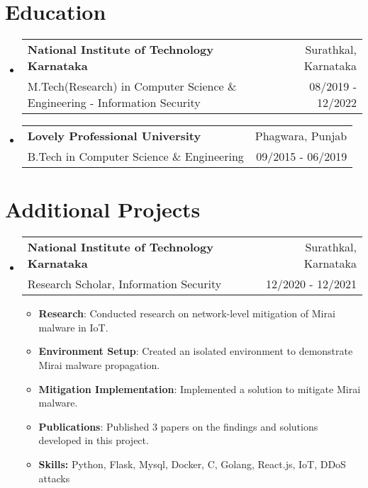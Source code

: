 \documentclass[letterpaper,11pt]{article}
\makeatletter
\newcommand{\cvitem}[1]{
  \item\small{
    {#1\vspace{-2pt}}
  }
}
\newcommand{\cvheading}[4]{
  \vspace{-2pt}\item
    \begin{tabular*}{\textwidth}[t]{l@{\extracolsep{\fill}}r}
      \textbf{#1} & #2 \\
      \small#3 & \small #4 \\
    \end{tabular*}\vspace{-7pt}
}
\newcommand{\cvheadingstart}{\begin{itemize}[leftmargin=0in, label={}]}
\newcommand{\cvheadingend}{\end{itemize}}
\newcommand{\cvitemstart}{\begin{itemize}\justifying}
\newcommand{\cvitemend}{\end{itemize}\vspace{-5pt}}
\makeatother
\begin{document}
\vspace{2pt}

\section{Education}
\cvheadingstart
  \cvheading
    {National Institute of Technology Karnataka}{Surathkal, Karnataka}
    {M.Tech(Research) in Computer Science \& Engineering - Information Security}{08/2019 - 12/2022}
  \cvheading
    {Lovely Professional University}{Phagwara, Punjab}
    {B.Tech in Computer Science \& Engineering}{09/2015 - 06/2019}
\cvheadingend

\section{Additional Projects}
\cvheadingstart
  \cvheading
    {National Institute of Technology Karnataka}{Surathkal, Karnataka}
    {Research Scholar, Information Security}{12/2020 - 12/2021}
  \cvitemstart
  \cvitem{\textbf{Research}: Conducted research on network-level mitigation of Mirai malware in IoT.}
    \cvitem{\textbf{Environment Setup}: Created an isolated environment to demonstrate Mirai malware propagation.}
    \cvitem{\textbf{Mitigation Implementation}: Implemented a solution to mitigate Mirai malware.}
    \cvitem{\textbf{Publications}: Published 3 papers on the findings and solutions developed in this project.}
    \cvitem{\textbf{Skills: } Python, Flask, Mysql, Docker, C, Golang, React.js, IoT, DDoS attacks}
  \cvitemend

\cvheadingend
\end{document}
